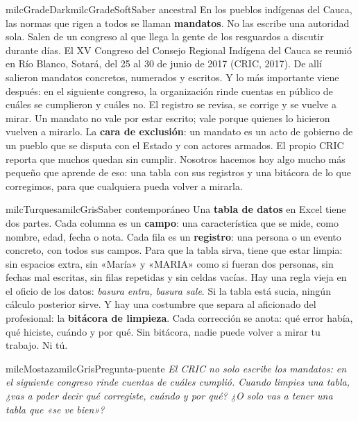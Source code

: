 \documentclass[11pt,letterpaper]{article}
\begin{document}
\begin{softbox}{milcGradeDark}{milcGradeSoft}{Saber ancestral}
En los pueblos indígenas del Cauca, las normas que rigen a todos se llaman \textbf{mandatos}. No las escribe una autoridad sola. Salen de un congreso al que llega la gente de los resguardos a discutir durante días. El XV Congreso del Consejo Regional Indígena del Cauca se reunió en Río Blanco, Sotará, del 25 al 30 de junio de 2017 (CRIC, 2017). De allí salieron mandatos concretos, numerados y escritos. Y lo más importante viene después: en el siguiente congreso, la organización rinde cuentas en público de cuáles se cumplieron y cuáles no. El registro se revisa, se corrige y se vuelve a mirar. Un mandato no vale por estar escrito; vale porque quienes lo hicieron vuelven a mirarlo. La \textbf{cara de exclusión}: un mandato es un acto de gobierno de un pueblo que se disputa con el Estado y con actores armados. El propio CRIC reporta que muchos quedan sin cumplir. Nosotros hacemos hoy algo mucho más pequeño que aprende de eso: una tabla con sus registros y una bitácora de lo que corregimos, para que cualquiera pueda volver a mirarla.\par{}
\end{softbox}

\begin{softbox}{milcTurquesa}{milcGris}{Saber contemporáneo}
Una \textbf{tabla de datos} en Excel tiene dos partes. Cada columna es un \textbf{campo}: una característica que se mide, como nombre, edad, fecha o nota. Cada fila es un \textbf{registro}: una persona o un evento concreto, con todos sus campos. Para que la tabla sirva, tiene que estar limpia: sin espacios extra, sin «María» y «MARIA» como si fueran dos personas, sin fechas mal escritas, sin filas repetidas y sin celdas vacías. Hay una regla vieja en el oficio de los datos: \emph{basura entra, basura sale}. Si la tabla está sucia, ningún cálculo posterior sirve. Y hay una costumbre que separa al aficionado del profesional: la \textbf{bitácora de limpieza}. Cada corrección se anota: qué error había, qué hiciste, cuándo y por qué. Sin bitácora, nadie puede volver a mirar tu trabajo. Ni tú.
\end{softbox}

\begin{softbox}{milcMostaza}{milcGris}{Pregunta-puente}
\textit{El CRIC no solo escribe los mandatos: en el siguiente congreso rinde cuentas de cuáles cumplió. Cuando limpies una tabla, ¿vas a poder decir qué corregiste, cuándo y por qué? ¿O solo vas a tener una tabla que «se ve bien»?}
\end{softbox}
\end{document}
